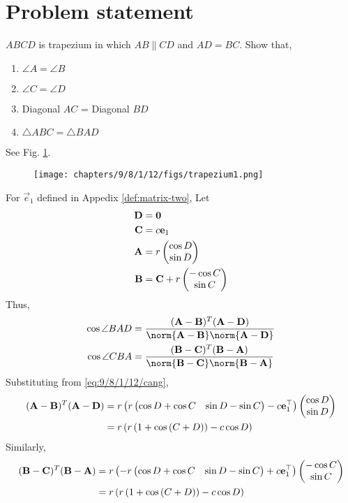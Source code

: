 \documentclass[journal,10pt,twocolumn]{article}
\begin{document}
\section{Problem statement}
\fi
$ABCD$ is trapezium in which $AB \parallel CD$ and $AD=BC$.
Show that, 
\begin{enumerate}
    \item $\angle A = \angle B$
    \item $\angle C = \angle D$
    \item Diagonal $AC$ = Diagonal $BD$
    \item $\triangle ABC  = \triangle BAD$
\end{enumerate}
\iffalse
\solution 
See Fig. 
		\ref{fig:9/8/1/12}.
	\begin{figure}[H]
		\centering
 \texttt{[image: chapters/9/8/1/12/figs/trapezium1.png]}
		\caption{}
		\label{fig:9/8/1/12}
  	\end{figure}
For $\vec{e}_1$ defined in Appedix \ref{def:matrix-two},
    Let 
\begin{align}
	 \label{eq:9/8/1/12/cang}
		\begin{split}
	\mathbf{D} &= \mathbf{0}
	\\
	\mathbf{C}&= c\mathbf{e}_1
\\
	\mathbf{A}&= r\begin{pmatrix}\cos D \\ \sin D\end{pmatrix}
\\
	\mathbf{B}&= \mathbf{C} +  r\begin{pmatrix}-\cos C \\ \sin C\end{pmatrix}
		\end{split}
\end{align}
%
Thus, 
\begin{align}
	 \label{eq:9/8/1/12/cang/a}
	\cos \angle{BAD}
	&= \frac{(\vec{A}-\vec{B})^T(\vec{A}-\vec{D})}{\norm{\vec{A}-\vec{B}}\norm{\vec{A}-\vec{D}}}
	\\
\cos	\angle{CBA}
	 &= \frac{(\vec{B}-\vec{C})^T(\vec{B}-\vec{A})}{\norm{\vec{B}-\vec{C}}\norm{\vec{B}-\vec{A}}}
	 \label{eq:9/8/1/12/cang/b}
%
\end{align}
Substituting from 
	 \eqref{eq:9/8/1/12/cang},
\begin{align}
	 \label{eq:9/8/1/12/cang/abd}
	 (\mathbf{A}-\mathbf{B})^T(\mathbf{A}-\mathbf{D}) &= r\left(r\begin{pmatrix}\cos D+ \cos C  & \sin D - \sin C\end{pmatrix}-c\mathbf{e}_1^{\top}\right)\begin{pmatrix}\cos D \\ \sin D\end{pmatrix}
	 \\
	&= r\left(r\left(1+ \cos \left(C+D\right)  \right)-c\cos D \right)
\end{align}
Similarly, 
\begin{align}
	 \label{eq:9/8/1/12/cang/abc}
(\mathbf{B}-\mathbf{C})^T(\mathbf{B}-\mathbf{A})
	&= r\left(-r\begin{pmatrix}\cos D+ \cos C  & \sin D - \sin C\end{pmatrix}+c\mathbf{e}_1^{\top}\right)\begin{pmatrix}-\cos C \\ \sin C\end{pmatrix}
	 \\
	&= r\left(r\left(1+ \cos \left(C+D\right)  \right)-c\cos D \right)
\end{align}
\end{document}
